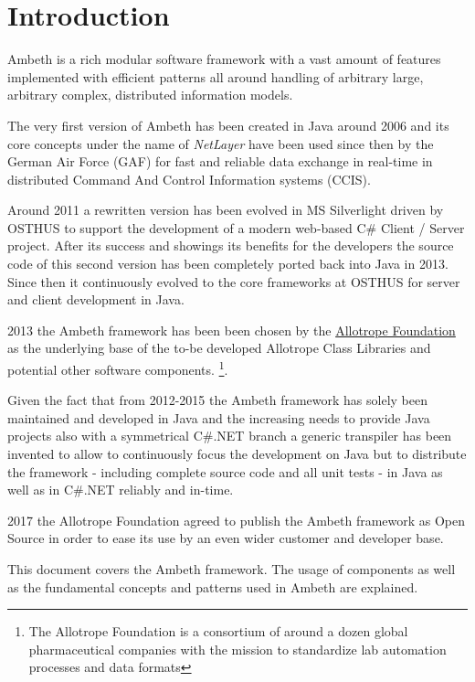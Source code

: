 \chapter{Introduction}
\label{Introduction}


Ambeth is a rich modular software framework with a vast amount of features implemented with efficient patterns all around handling of arbitrary large, arbitrary complex, distributed information models.

The very first version of Ambeth has been created in Java around 2006 and its core concepts under the name of \textit{NetLayer} have been used since then by the German Air Force (GAF) for fast and reliable data exchange in real-time in distributed Command And Control Information systems (CCIS).

Around 2011 a rewritten version has been evolved in MS Silverlight driven by OSTHUS\textsuperscript{\textregistered} to support the development of a modern web-based C\# Client / Server project. After its success and showings its benefits for the developers the source code of this second version has been completely ported back into Java in 2013. Since then it continuously evolved to the core frameworks at OSTHUS\textsuperscript{\textregistered} for server and client development in Java.

2013 the Ambeth framework has been been chosen by the \href{http://www.allotrope.org}{Allotrope Foundation} as the underlying base of the to-be developed Allotrope Class Libraries and potential other software components. \footnote{The Allotrope Foundation is a consortium of around a dozen global pharmaceutical companies with the mission to standardize lab automation processes and data formats}.

Given the fact that from 2012-2015 the Ambeth framework has solely been maintained and developed in Java and the increasing needs to provide Java projects also with a symmetrical C\#.NET branch a generic transpiler has been invented to allow to continuously focus the development on Java but to distribute the framework - including complete source code and all unit tests - in Java as well as in C\#.NET reliably and in-time.

2017 the Allotrope Foundation agreed to publish the Ambeth framework as Open Source in order to ease its use by an even wider customer and developer base.

This document covers the Ambeth framework. The usage of components as well as the fundamental concepts and patterns used in Ambeth are explained.

